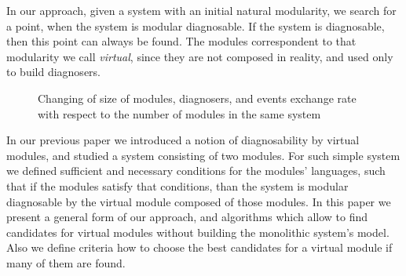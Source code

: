 \documentclass[a4paper, 10pt, conference]{ieeeconf}
\begin{document}
In our approach, given a system with an initial natural modularity, we search
for a point, when the system is modular diagnosable. If the system is diagnosable,
then this point can always be found. The modules correspondent to that
modularity we call \emph{virtual}, since they are not composed in reality, and
used only to build diagnosers.

\begin{figure}
\caption{Changing of size of modules, diagnosers, and events exchange rate
with respect to the number of modules in the same system}
\label{fig:curves}
\end{figure}

In our previous paper \cite{myadzelets_virtual_2013} we introduced a notion of
diagnosability by virtual modules, and studied a system consisting of
two modules. For such simple system we defined sufficient and necessary
conditions for the modules' languages, such that if the modules satisfy that
conditions, than the system is modular diagnosable by the virtual module
composed of those modules. In this paper we present a general form of our
approach, and algorithms which allow to find candidates for virtual modules
without building the monolithic system's model. Also we define criteria how to
choose the best candidates for a virtual module if many of them are found.
\end{document}
